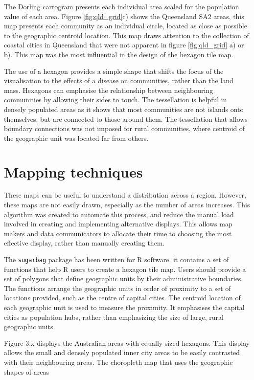 \documentclass{monashthesis}
\begin{document}
The Dorling cartogram presents each individual area scaled for the population value of each area. Figure \ref{fig:qld_grid}c) shows the Queensland SA2 areas, this map presents each community as an individual circle, located as close as possible to the geographic centroid location. This map draws attention to the collection of coastal cities in Queensland that were not apparent in figure \ref{fig:qld_grid} a) or b).
This map was the most influential in the design of the hexagon tile map.

The use of a hexagon provides a simple shape that shifts the focus of the visualisation to the effects of a disease on communities, rather than the land mass. Hexagons can emphasise the relationship between neighbouring communities by allowing their sides to touch. The tessellation is helpful in densely populated areas as it shows that most communities are not islands onto themselves, but are connected to those around them. The tessellation that allows boundary connections was not imposed for rural communities, where centroid of the geographic unit was located far from others.

\hypertarget{mapping-techniques}{%
\section{Mapping techniques}\label{mapping-techniques}}

These maps can be useful to understand a distribution across a region. However, these maps are not easily drawn, especially as the number of areas increases. This algorithm was created to automate this process, and reduce the manual load involved in creating and implementing alternative displays. This allows map makers and data communicators to allocate their time to choosing the most effective display, rather than manually creating them.

The \texttt{sugarbag} package has been written for R software, it contains a set of functions that help R users to create a hexagon tile map.
Users should provide a set of polygons that define geographic units by their administrative boundaries. The functions arrange the geographic units in order of proximity to a set of locations provided, such as the centre of capital cities.
The centroid location of each geographic unit is used to measure the proximity.
It emphasises the capital cities as population hubs, rather than emphasizing the size of large, rural geographic units.

Figure 3.x displays the Australian areas with equally sized hexagons. This display allows the small and densely populated inner city areas to be easily contrasted with their neighbouring areas.
The choropleth map that uses the geographic shapes of areas
\end{document}
